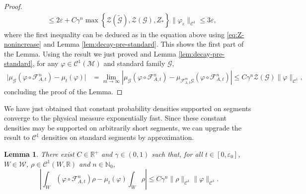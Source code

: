 \documentclass{amsart}
\numberwithin{equation}{section}
\newtheorem{lemma}[theorem]{Lemma}
\newcommand\ve{\varepsilon}
\newcommand\vf{\varphi}
\renewcommand{\le}{\leqslant}
\newcommand\cC{{\mathcal C}}
\newcommand\cF{{\mathcal F}}
\newcommand\cG{{\mathcal G}}
\newcommand\cM{{\mathcal M}}
\newcommand\cW{{\mathcal W}}
\newcommand\cZ{{\mathcal Z}}
\newcommand\bN{{\mathbb N}}
\newcommand\bR{{\mathbb R}}
\newcommand{\catt}{\cF_{A,t}}
\begin{document}
\begin{proof}
\[\begin{split}
&\le 2\ve + C\gamma^n \max \left\{\cZ(\widetilde \cG), \cZ(\cG), Z_{*}\right\}\|\vf_{\ve}\|_{\cC^1} \le 3 \ve,
\end{split}
\]
where the first inequality can be deduced as in the equation above using \eqref{eq:Z-nonincrease} and Lemma \ref{lem:decay-pre-standard}. This shows the first part of the Lemma. Using the result we just proved and Lemma \ref{lem:decay-pre-standard}, for any \(\vf \in \cC^1(\cM)\) and standard family \(\cG\),
\[
\begin{split}
\bigl|\mu_{\cG}(\vf \circ \catt^n ) \!-\! \mu_t(\vf) \bigr| & = \!\!\lim_{m \to \infty}\!|\mu_{\cG}(\vf \circ \catt^n ) \!- \!\mu_{\catt^m \cG}(\vf \circ \catt^n) |\!\le\! C \gamma^n\! \cZ(\cG)\|\vf\|_{\cC^1},
\end{split}
\]
concluding the proof of the Lemma.
\end{proof}
We have just obtained that constant probability densities supported on segments converge to the physical measure exponentially fast. Since these constant densities may be supported on arbitrarily short segments, we can upgrade the result to \(\cC^1\) densities on standard segments by approximation.
\begin{lemma}\label{lem:spc1}
There exist \(C \in \bR^+\) and \(\gamma \in (0,1)\) such that, for all \(t \in [0,\ve_0]\), \(W \in \cW\), \(\rho \in \cC^1(W, \bR)\) and \(n \in \bN_0\),
\[
\left|\int_{W} (\vf \circ \catt^n) \rho - \mu_t(\vf)\int_{W} \rho \right| \le C \gamma^n \|\rho\|_{\cC^1}\|\vf\|_{\cC^1}.
\]
\end{lemma}
\end{document}
